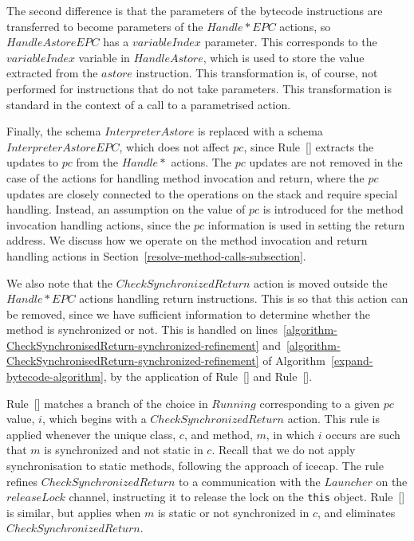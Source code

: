 The second difference is that the parameters of the bytecode
instructions are transferred to become parameters of the
$Handle{*}EPC$ actions, so $HandleAstoreEPC$ has a $variableIndex$
parameter.
This corresponds to the $variableIndex$ variable in $HandleAstore$,
which is used to store the value extracted from the $astore$
instruction.
This transformation is, of course, not performed for instructions that
do not take parameters.
This transformation is standard in the context of a call to a
parametrised action.

Finally, the schema $InterpreterAstore$ is replaced with a schema
$InterpreterAstoreEPC$, which does not affect $pc$, since
Rule~[] extracts the
updates to $pc$ from the $Handle{*}$ actions.
The $pc$ updates are not removed in the case of the actions for
handling method invocation and return, where the $pc$ updates are
closely connected to the operations on the stack and require special
handling.
Instead, an assumption on the value of $pc$ is introduced for the
method invocation handling actions, since the $pc$ information is used
in setting the return address.
We discuss how we operate on the method invocation and return handling
actions in Section~\ref{resolve-method-calls-subsection}.

We also note that the $CheckSynchronizedReturn$ action is moved
outside the $Handle{*}EPC$ actions handling return instructions.
This is so that this action can be removed, since we have sufficient
information to determine whether the method is synchronized or not.
This is handled on
lines~\ref{algorithm-CheckSynchronisedReturn-synchronized-refinement}
and~\ref{algorithm-CheckSynchronisedReturn-synchronized-refinement} of
Algorithm~\ref{expand-bytecode-algorithm}, by the application of
Rule~[]
and
Rule~[].

Rule~[]
matches a branch of the choice in $Running$ corresponding to a given
$pc$ value, $i$, which begins with a $CheckSynchronizedReturn$ action.
This rule is applied whenever the unique class, $c$, and method, $m$,
in which $i$ occurs are such that $m$ is synchronized and not static
in $c$.
Recall that we do not apply synchronisation to static methods,
following the approach of icecap.
The rule refines $CheckSynchronizedReturn$ to a communication with the
$Launcher$ on the $releaseLock$ channel, instructing it to release the
lock on the \texttt{this} object.
Rule~[]
is similar, but applies when $m$ is static or not synchronized in $c$,
and eliminates $CheckSynchronizedReturn$.


